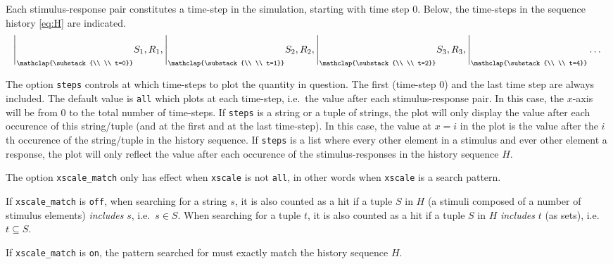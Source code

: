 \documentclass[11pt]{article}
\begin{document}
Each stimulus-response pair constitutes a time-step in the simulation, starting with time step 0. Below, the time-steps in the sequence history \eqref{eq:H} are indicated.
\[
\Biggr|_{\mathclap{\substack{\\ \\ t=0}}} S_1, R_1,
\Biggr|_{\mathclap{\substack{\\ \\ t=1}}} S_2, R_2,
\Biggr|_{\mathclap{\substack{\\ \\ t=2}}} S_3, R_3,
\Biggr|_{\mathclap{\substack{\\ \\ t=4}}} \dotsc
\]

The option \verb|steps| controls at which time-steps to plot the quantity in question. The first (time-step 0) and the last time step are always included.
The default value is \verb|all| which plots at each time-step, i.e.\ the value after each stimulus-response pair. In this case, the $x$-axis will be from 0 to the total number of time-steps. If \verb|steps| is a string or a tuple of strings, the plot will only display the value after each occurence of this string/tuple (and at the first and at the last time-step). In this case, the value at $x=i$ in the plot is the value after the $i$th occurence of the string/tuple in the history sequence. If \verb|steps| is a list where every other element in a stimulus and ever other element a response, the plot will only reflect the value after each occurence of the stimulus-responses in the history sequence $H$.

The option \verb|xscale_match| only has effect when \verb|xscale| is not \verb|all|, in other words when \verb|xscale| is a search pattern.

If \verb|xscale_match| is \verb|off|, when searching for a string $s$, it is also counted as a hit if a tuple $S$ in $H$ (a stimuli composed of a number of stimulus elements) \emph{includes} $s$, i.e.\ $s \in S$. When searching for a tuple $t$, it is also counted as a hit if a tuple $S$ in $H$ \emph{includes} $t$ (as sets), i.e.\ $t \subseteq S$.

If \verb|xscale_match| is \verb|on|, the pattern searched for must exactly match the history sequence $H$.
\end{document}
